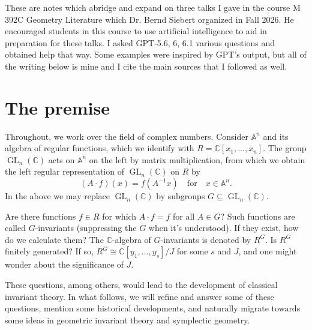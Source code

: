 \documentclass[11pt,leqno]{article}
\theoremstyle{plain}
\theoremstyle{definition}
\numberwithin{equation}{section}
\numberwithin{lem}{section}
\DeclareMathOperator{\GL}{GL}
\begin{document}
These are notes which abridge and expand on three talks I gave in the course M 392C Geometry Literature which Dr. Bernd Siebert organized in Fall 2026. He encouraged students in this course to use artificial intelligence to aid in preparation for these talks. I asked GPT-5.6, 6, 6.1 various questions and obtained help that way. Some examples were inspired by GPT's output, but all of the writing below is mine and I cite the main sources that I followed as well.

\begin{abstract}\noindent
  In this note we tell a short story chronicling the birth of classical invariant theory, some basic ideas in geometric invariant theory, and finally a brief exposition of the Kempf-Ness theorem. The Kempf-Ness theorem may be used to show that the geometric invariant theory quotient of a complex smooth projective variety $X$ by a complex reductive group $G$ is homeomorphic to the symplectic quotient of $X$ by a maximal compact subgroup of $G$.
\end{abstract}

\section{The premise}
Throughout, we work over the field of complex numbers. Consider $\mathbb A^n$ and its algebra of regular functions, which we identify with $R = \mathbb C[x_1,\dots,x_n]$. The group $\GL_n(\mathbb C)$ acts on $\mathbb A^n$ on the left by matrix multiplication, from which we obtain the left regular representation of $\GL_n(\mathbb C)$ on $R$ by
\[(A\cdot f)(x) = f(A^{-1}x)\quad \text{for}\quad x\in\mathbb A^n.\]
In the above we may replace $\GL_n(\mathbb C)$ by subgroups $G\subseteq \GL_n(\mathbb C)$.

Are there functions $f\in R$ for which $A\cdot f = f$ for all $A\in G$? Such functions are called $G$-invariants (suppressing the $G$ when it's understood). If they exist, how do we calculate them? The $\mathbb C$-algebra of $G$-invariants is denoted by $R^G$. Is $R^G$ finitely generated? If so, $R^G\cong \mathbb C[y_1,\dots,y_s]/J$ for some $s$ and $J$, and one might wonder about the significance of $J$.

These questions, among others, would lead to the development of classical invariant theory. In what follows, we will refine and answer some of these questions, mention some historical developments, and naturally migrate towards some ideas in geometric invariant theory and symplectic geometry.
\end{document}
